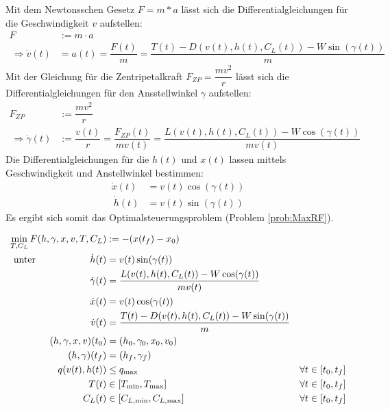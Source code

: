 Mit dem Newtonsschen Gesetz $F = m * a$ lässt sich die Differentialgleichungen für die Geschwindigkeit $v$ aufstellen:
\[\begin{split}
    F &:= m \cdot a \\\
    \Rightarrow \dot{v}(t) &= a(t) = \dfrac{F(t)}{m} = \dfrac{T(t) - D(v(t),h(t),C_L(t)) - W \sin(\gamma(t))}{m}
\end{split} \]
Mit der Gleichung für die Zentripetalkraft $F_{ZP} = \dfrac{m v^2}{r}$ lässt sich die Differentialgleichungen für den Ansstellwinkel $\gamma$ aufstellen:
\[\begin{split}
    F_{ZP} &:= \dfrac{m v^2}{r} \\\
    \Rightarrow \dot{\gamma}(t) &:= \dfrac{v(t)}{r} = \dfrac{F_{ZP}(t)}{m v(t)} = \dfrac{L(v(t),h(t),C_L(t)) - W \cos(\gamma(t))}{m v(t)}
\end{split} \]
Die Differentialgleichungen für die $h(t)$ und $x(t)$ lassen mittels Geschwindigkeit und Anstellwinkel bestimmen:
\[\begin{split}
    \dot{x}(t) &= v(t) \cos(\gamma(t))\\\
    \dot{h}(t) &= v(t) \sin(\gamma(t))
\end{split} \]
Es ergibt sich somit das Optimalsteuerungsproblem (Problem \ref{prob:MaxRF}).

\begin{problem}\label{prob:MaxRF}
\begin{align*}
    \min_{T, C_L} F(h,\gamma,x,v,T,C_L) &:= -(x(t_f) - x_0) & & \\\
    \text{unter} \hspace{20mm} \dot{h}(t) &= v(t) \sin(\gamma(t)) \hspace{27mm} & & \\\
    \dot{\gamma}(t) &=  \dfrac{L(v(t),h(t),C_L(t)) - W \cos(\gamma(t))}{mv(t)} & & \\\
    \dot{x}(t) &= v(t) \cos(\gamma(t)) & & \\\
    \dot{v}(t) &= \dfrac{T(t) - D(v(t),h(t),C_L(t)) - W \sin(\gamma(t))}{m} & & \\\
    (h,\gamma,x,v)(t_0) &= (h_0,\gamma_0,x_0,v_0) & & \\\
    (h,\gamma)(t_f) &= (h_f,\gamma_f) & & \\\
    q(v(t),h(t)) &\leq q_{\max} \hspace{19.5mm} & & \forall t \in [t_0,t_f]\\\
    T(t) &\in [T_{\min},T_{\max}] & & \forall t \in [t_0,t_f] \\\
    C_L(t) &\in [C_{L, \min},C_{L, \max}] & & \forall t \in [t_0,t_f]
\end{align*}
\end{problem}


